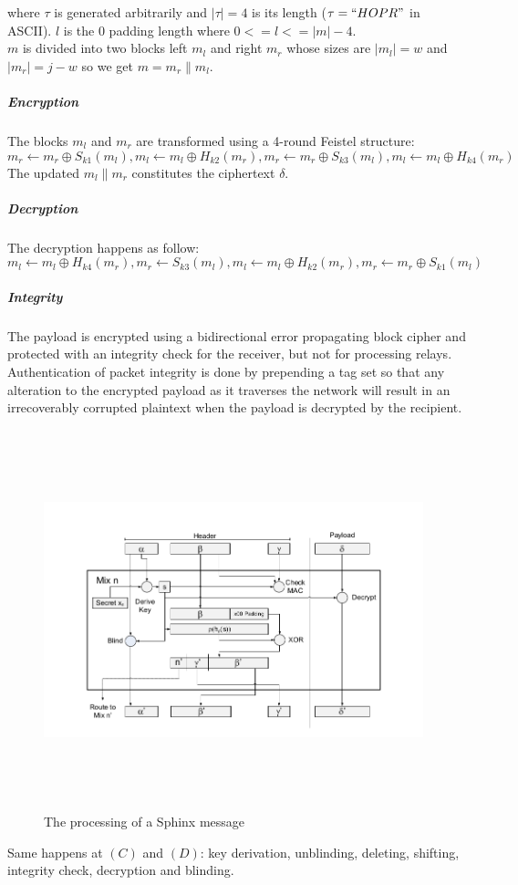  where $\tau$ is generated arbitrarily and $|\tau|=4$ is its length ($\tau=``HOPR "$ in ASCII). $l$ is the $0$ padding length where
$0 <= l <= |m| - 4$. 
\\$m$ is divided into two blocks left $m_l$ and right $m_r$ whose sizes are $|m_l|=w$ and $|m_r|=j-w$ so we get $m=m_r\|m_l$.
\subparagraph{Encryption}
The blocks $m_l$ and $m_r$ are transformed using a 4-round Feistel structure:
$$m_r\leftarrow m_r \oplus S_{k1}(m_l), m_l\leftarrow m_l \oplus H_{k2}(m_r), m_r\leftarrow m_r\oplus S_{k3}(m_l), m_l\leftarrow m_l\oplus H_{k4}(m_r)$$
The updated $m_l\|m_r$ constitutes the ciphertext $\delta$.
\subparagraph{Decryption} The decryption happens as follow:
$$m_l\leftarrow m_l\oplus H_{k4}(m_r), m_r\leftarrow S_{k3}(m_l), m_l\leftarrow m_l\oplus H_{k2}(m_r), m_r\leftarrow m_r\oplus S_{k1}(m_l)$$
\subparagraph{Integrity}
The payload is encrypted using a bidirectional error propagating block cipher
and protected with an integrity check for the receiver, but not
for processing relays. Authentication of packet integrity is done by prepending a tag set so that any alteration to the encrypted payload as it traverses the network will result in an irrecoverably corrupted plaintext when the payload is decrypted by the recipient.

\begin{figure}[H]
    \centering
    \includegraphics[width=11cm,height=11cm,keepaspectratio]{../yellowpaper/images/sphinx1.png}
    \caption{The processing of a Sphinx message \cite{sphinxpaper}}
    \label{fig:The processing of a Sphinx message }
\end{figure}
\hspace{-5mm}Same happens at $(C)$ and $(D)$: key derivation, unblinding, deleting, shifting, integrity check, decryption and blinding.
